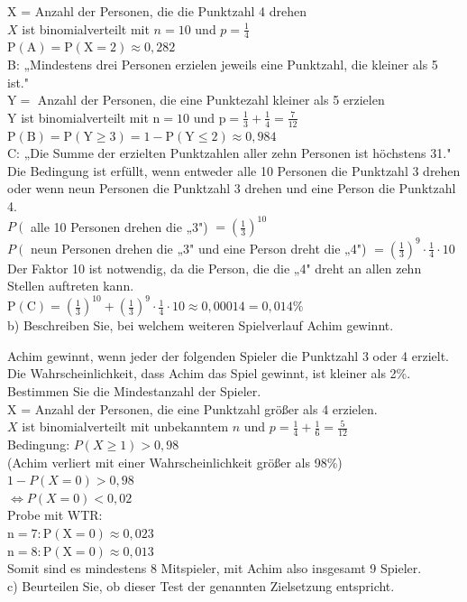 \documentclass[10pt]{article}
\begin{document}
X = Anzahl der Personen, die die Punktzahl 4 drehen\\
$X$ ist binomialverteilt mit $n=10$ und $p=\frac{1}{4}$\\
$\mathrm{P}(\mathrm{A})=\mathrm{P}(\mathrm{X}=2) \approx 0,282$\\
B: „Mindestens drei Personen erzielen jeweils eine Punktzahl, die kleiner als 5 ist."\\
$\mathrm{Y}=$ Anzahl der Personen, die eine Punktezahl kleiner als 5 erzielen\\
Y ist binomialverteilt mit $\mathrm{n}=10$ und $\mathrm{p}=\frac{1}{3}+\frac{1}{4}=\frac{7}{12}$\\
$\mathrm{P}(\mathrm{B})=\mathrm{P}(\mathrm{Y} \geq 3)=1-\mathrm{P}(\mathrm{Y} \leq 2) \approx 0,984$\\
C: „Die Summe der erzielten Punktzahlen aller zehn Personen ist höchstens 31."\\
Die Bedingung ist erfüllt, wenn entweder alle 10 Personen die Punktzahl 3 drehen oder wenn neun Personen die Punktzahl 3 drehen und eine Person die Punktzahl 4.\\
$P\left(\right.$ alle 10 Personen drehen die „3") $=\left(\frac{1}{3}\right)^{10}$\\
$P\left(\right.$ neun Personen drehen die „3" und eine Person dreht die „4") $=\left(\frac{1}{3}\right)^{9} \cdot \frac{1}{4} \cdot 10$\\
Der Faktor 10 ist notwendig, da die Person, die die „4" dreht an allen zehn Stellen auftreten kann.\\
$\mathrm{P}(\mathrm{C})=\left(\frac{1}{3}\right)^{10}+\left(\frac{1}{3}\right)^{9} \cdot \frac{1}{4} \cdot 10 \approx 0,00014=0,014 \%$\\
b) Beschreiben Sie, bei welchem weiteren Spielverlauf Achim gewinnt.

Achim gewinnt, wenn jeder der folgenden Spieler die Punktzahl 3 oder 4 erzielt.\\
Die Wahrscheinlichkeit, dass Achim das Spiel gewinnt, ist kleiner als 2\%.\\
Bestimmen Sie die Mindestanzahl der Spieler.\\
X = Anzahl der Personen, die eine Punktzahl größer als 4 erzielen.\\
$X$ ist binomialverteilt mit unbekanntem $n$ und $p=\frac{1}{4}+\frac{1}{6}=\frac{5}{12}$\\
Bedingung: $P(X \geq 1)>0,98$\\
(Achim verliert mit einer Wahrscheinlichkeit größer als 98\%)\\
$1-P(X=0)>0,98$\\
$\Leftrightarrow P(X=0)<0,02$\\
Probe mit WTR:\\
$\mathrm{n}=7: \mathrm{P}(\mathrm{X}=0) \approx 0,023$\\
$\mathrm{n}=8: \mathrm{P}(\mathrm{X}=0) \approx 0,013$\\
Somit sind es mindestens 8 Mitspieler, mit Achim also insgesamt 9 Spieler.\\
c) Beurteilen Sie, ob dieser Test der genannten Zielsetzung entspricht.
\end{document}
